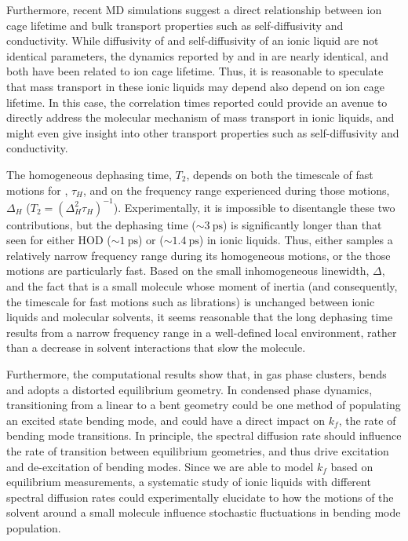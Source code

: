 {Furthermore, recent MD simulations suggest a direct relationship between ion cage lifetime and bulk transport properties such as self-diffusivity and conductivity.\cite{Zhang2015b} While diffusivity of  and self-diffusivity of an ionic liquid are not identical parameters, the dynamics reported by  and \ce{[SCN]-}\cite{Ren2014} in \ce{[Im_{4,1}][Tf2N]} are nearly identical, and both have been related to ion cage lifetime. Thus, it is reasonable to speculate that  mass transport in these ionic liquids may depend also depend on ion cage lifetime. In this case, the correlation times reported could provide an avenue to directly address the molecular mechanism of  mass transport in ionic liquids, and might even give insight into other transport properties such as self-diffusivity and conductivity.

The homogeneous dephasing time, \(T_2\), depends on both the timescale of fast motions for , $\tau_H$, and on the frequency range experienced during those motions, \(\Delta_H\) ($T_{2} = \left( {\Delta}_H^{2}\tau_H \right)^{-1}$). Experimentally, it is impossible to disentangle these two contributions, but the dephasing time (\(\sim \SI{3}{\ps}\)) is significantly longer than that seen for either HOD (\(\sim \SI{1}{\ps}\)) or  (\(\sim \SI{1.4}{\ps}\)) in ionic liquids. Thus, either  samples a relatively narrow frequency range during its homogeneous motions, or the those motions are particularly fast. Based on the small inhomogeneous linewidth, \(\Delta\), and the fact that  is a small molecule whose moment of inertia (and consequently, the timescale for fast motions such as librations) is unchanged between ionic liquids and molecular solvents, it seems reasonable that the long dephasing time results from a narrow frequency range in a well-defined local environment, rather than a decrease in solvent interactions that slow the molecule.

Furthermore, the computational results show that, in gas phase clusters,  bends and adopts a distorted equilibrium geometry. In condensed phase dynamics, transitioning from a linear to a bent geometry could be one method of populating an excited state bending mode, and could have a direct impact on \(k_f\), the rate of bending mode transitions. In principle, the spectral diffusion rate should influence the rate of transition between equilibrium geometries, and thus drive excitation and de-excitation of bending modes. Since we are able to model \(k_f\) based on equilibrium measurements, a systematic study of ionic liquids with different spectral diffusion rates could experimentally elucidate to how the motions of the solvent around a small molecule influence stochastic fluctuations in bending mode population.

}

